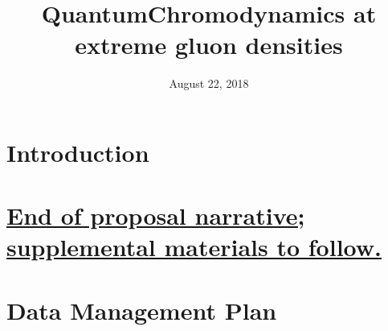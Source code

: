 \documentclass{DOEproposal}
\institute{North Carolina State University}
\title{QuantumChromodynamics at extreme gluon densities}
\date{August 22, 2018}
\renewcommand*{\maketitle}{}
\begin{document}
    \maketitle

    \renewcommand{\contentsname}{Table of Contents}
    \tableofcontents
    \newpage

    \setcounter{page}{1}
    \section{Introduction}
    
    \newpage



    
    
    
    





    
		\vspace{1em}
    \section*{\underline{End of proposal narrative; supplemental materials to follow.}}
    \newpage


    
	    \section{Data Management Plan}
        \label{sec:data_management}
        
	
\end{document}
